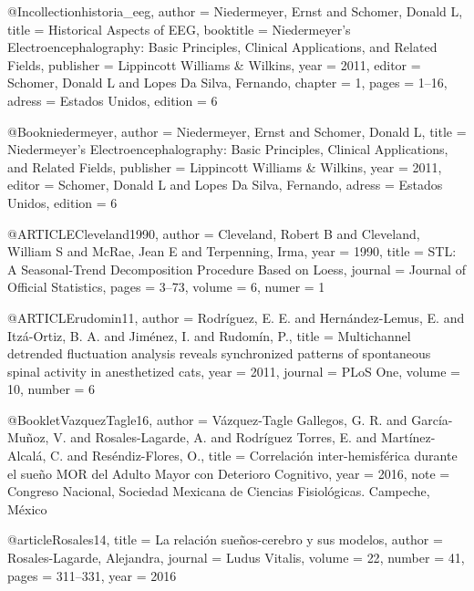 @Incollection{historia_eeg,
    author    = {Niedermeyer, Ernst 
                 and Schomer, Donald L},
    title     = {Historical {A}spects of {EEG}},
    booktitle = {Niedermeyer's {E}lectroencephalography: {B}asic {P}rinciples, {C}linical 
                 {A}pplications, and {R}elated {F}ields},
    publisher = {Lippincott {W}illiams \& {W}ilkins},
    year      = {2011},
    editor    = {Schomer, Donald L and Lopes Da Silva, Fernando},
    chapter   = {1},
    pages     = {1--16},
    adress    = {Estados Unidos},
    edition   = {6}
}

@Book{niedermeyer,
    author    = {Niedermeyer, Ernst 
                 and Schomer, Donald L},
    title = {Niedermeyer's {E}lectroencephalography: {B}asic {P}rinciples, {C}linical 
                 {A}pplications, and {R}elated {F}ields},
    publisher = {Lippincott {W}illiams \& {W}ilkins},
    year      = {2011},
    editor    = {Schomer, Donald L and Lopes Da Silva, Fernando},
    adress    = {Estados Unidos},
    edition   = {6}
}

@ARTICLE{Cleveland1990,
    author =  {Cleveland, Robert B
               and Cleveland, William S 
               and McRae, Jean E
               and Terpenning, Irma},
    year =    {1990},
    title =   {{STL}: {A} {S}easonal-{T}rend {D}ecomposition {P}rocedure {B}ased on {L}oess},
    journal = {Journal of {O}fficial {S}tatistics},
    pages =   {3--73},
    volume =  {6},
    numer =   {1}
}

@ARTICLE{rudomin11,
    author =  {Rodr\'iguez, E. E. 
               and Hern\'andez-Lemus, E. 
               and Itz\'a-Ortiz, B. A. 
               and Jim\'enez, I. 
               and Rudom\'in, P.},
    title =   {Multichannel detrended fluctuation analysis reveals synchronized patterns of 
               spontaneous spinal activity in anesthetized cats},
    year =    {2011},
    journal = {PLoS One},
    volume =  {10},
    number =  {6}
}

@Booklet{VazquezTagle16,
    author =    {V\'azquez-Tagle Gallegos, G. R.
                 and Garc\'ia-Mu\~noz, V.
                 and Rosales-Lagarde, A.
                 and Rodr\'iguez Torres, E.
                 and Mart\'inez-Alcal\'a, C.
                 and Res\'endiz-Flores, O.},
    title =     {Correlaci\'on inter-hemisf\'erica durante el sueño {MOR} del {A}dulto {M}ayor 
                 con {D}eterioro {C}ognitivo},
    year =      {2016},
    note =      {Congreso Nacional, Sociedad Mexicana de Ciencias Fisiol\'ogicas. Campeche,
                 M\'exico}
}

@article{Rosales14,
    title   = {La relaci{\'o}n sue{\~n}os-cerebro y sus modelos},
    author  = {Rosales-Lagarde, Alejandra},
    journal = {Ludus {V}italis},
    volume  = {22},
    number  = {41},
    pages   = {311--331},
    year    = {2016}
}
